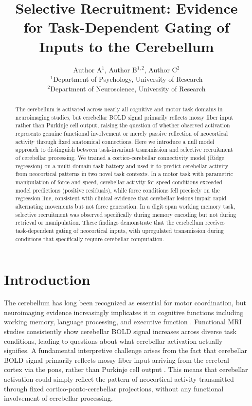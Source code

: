 \documentclass[11pt]{article}
\title{Selective Recruitment: Evidence for Task-Dependent Gating of Inputs to the Cerebellum}
\author{Author A$^{1}$, Author B$^{1,2}$, Author C$^{2}$ \\
\small $^{1}$Department of Psychology, University of Research \\
\small $^{2}$Department of Neuroscience, University of Research}
\date{}
\begin{document}
\maketitle

\begin{abstract}
The cerebellum is activated across nearly all cognitive and motor task domains in neuroimaging studies, but cerebellar BOLD signal primarily reflects mossy fiber input rather than Purkinje cell output, raising the question of whether observed activation represents genuine functional involvement or merely passive reflection of neocortical activity through fixed anatomical connections. Here we introduce a null model approach to distinguish between task-invariant transmission and selective recruitment of cerebellar processing. We trained a cortico-cerebellar connectivity model (Ridge regression) on a multi-domain task battery and used it to predict cerebellar activity from neocortical patterns in two novel task contexts. In a motor task with parametric manipulation of force and speed, cerebellar activity for speed conditions exceeded model predictions (positive residuals), while force conditions fell precisely on the regression line, consistent with clinical evidence that cerebellar lesions impair rapid alternating movements but not force generation. In a digit span working memory task, selective recruitment was observed specifically during memory encoding but not during retrieval or manipulation. These findings demonstrate that the cerebellum receives task-dependent gating of neocortical inputs, with upregulated transmission during conditions that specifically require cerebellar computation.
\end{abstract}

\section{Introduction}

The cerebellum has long been recognized as essential for motor coordination, but neuroimaging evidence increasingly implicates it in cognitive functions including working memory, language processing, and executive function \citep{schmahmann2019,buckner2013}. Functional MRI studies consistently show cerebellar BOLD signal increases across diverse task conditions, leading to questions about what cerebellar activation actually signifies. A fundamental interpretive challenge arises from the fact that cerebellar BOLD signal primarily reflects mossy fiber input arriving from the cerebral cortex via the pons, rather than Purkinje cell output \citep{diedrichsen2019,mathiesen1998}. This means that cerebellar activation could simply reflect the pattern of neocortical activity transmitted through fixed cortico-ponto-cerebellar projections, without any functional involvement of cerebellar processing.
\end{document}
